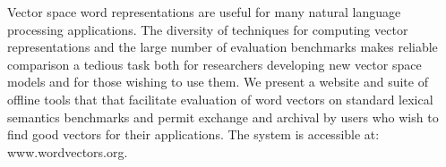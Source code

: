 Vector space word representations are useful for many natural language processing applications. The diversity of techniques for computing vector representations and the large number of evaluation benchmarks makes reliable comparison a tedious task both for researchers developing new vector space models and for those wishing to use them. We present a website and suite of offline tools that that facilitate evaluation of word vectors on standard lexical semantics benchmarks and permit exchange and archival by users who wish to find good vectors for their applications. The system is accessible at: www.wordvectors.org.
